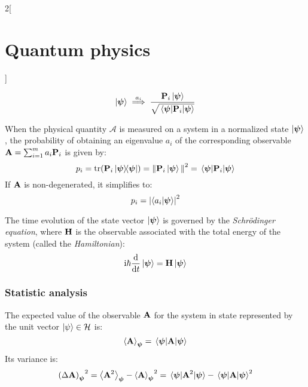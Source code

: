 \documentclass[../../../main_physics.tex]{subfiles}
\begin{document}
\begin{multicols}{2}[\section{Quantum physics}]
\begin{definition}
    $$\ket{\boldsymbol{\mathrm{\psi}}}\overset{a_i}{\implies}\frac{\boldsymbol{\mathrm{P}}_i\ket{\boldsymbol{\mathrm{\psi}}}}{\sqrt{\mel{\boldsymbol{\mathrm{\psi}}}{\boldsymbol{\mathrm{P}}_i}{\boldsymbol{\mathrm{\psi}}}}}$$
  \end{definition}
  \begin{definition}[Postulate IV]
    When the physical quantity $\mathcal{A}$ is measured on a system in a normalized state $\ket{\boldsymbol{\mathrm{\psi}}}$, the probability of obtaining an eigenvalue $a_i$ of the corresponding observable $\boldsymbol{\mathrm{A}}=\sum_{i=1}^ma_i\boldsymbol{\mathrm{P}}_i$ is given by:
    $$p_i=\trace(\vf{P}_i\dyad{\vf\psi}{\vf\psi})={\norm{\vf{P}_i\ket{\vf\psi}}}^2=\mel{\vf\psi}{\vf{P}_i}{\vf\psi}$$
    If $\boldsymbol{\mathrm{A}}$ is non-degenerated, it simplifies to: $$p_i={\abs{\braket{a_i}{\boldsymbol{\mathrm{\psi}}}}}^2$$
  \end{definition}
  \begin{definition}[Postulate V]
    The time evolution of the state vector $\ket{\boldsymbol{\mathrm{\psi}}}$ is governed by the \emph{Schrödinger equation}, where $\boldsymbol{\mathrm{H}}$ is the observable associated with the total energy of the system (called the \emph{Hamiltonian}): $$\mathrm{i} \hbar\dv{}{t}\ket{\boldsymbol{\mathrm{\psi}}}=\boldsymbol{\mathrm{H}}\ket{\boldsymbol{\mathrm{\psi}}}$$
  \end{definition}
  \subsubsection{Statistic analysis}
  \begin{proposition}
    The expected value of the observable $\boldsymbol{\mathrm{A}}$ for the system in state represented by the unit vector $\ket{\psi}\in\mathcal{H}$ is: $$\ev{\vf{A}}_{\vf\psi}=\ev{\vf{A}}{\vf\psi}$$
    Its variance is: $${{(\Delta\vf{A})}_{\vf\psi}}^2=\ev{\vf{A}^2}_{\vf\psi}-{\ev{\vf{A}}_{\vf\psi}}^2=\ev{\vf{A}^2}{\vf\psi}-\ev{\vf{A}}{\vf\psi}^2$$
  \end{proposition}
\end{multicols}
\end{document}
